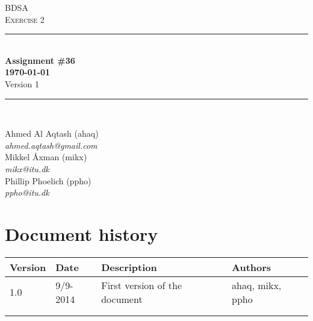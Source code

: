 \documentclass[10pt]{report}
\numberwithin{equation}{section} %
\numberwithin{figure}{section} %
\numberwithin{table}{section} %
\newcommand{\HRule}{\rule{\linewidth}{0.5mm}}
\begin{document}
\begin{titlepage}

\begin{center}

\textsc{\LARGE BDSA}\\[1.5cm]

\textsc{\Large Exercise 2}\\[0.5cm]

\HRule \\[0.4cm]

{ \bfseries Assignment \#36 \\[0.5cm] 
    {\small \today}} \\[0.7cm]
    {\small Version 1}

\HRule \\ [6.5cm]

\begin{minipage}{0.5\textwidth}
\begin{flushleft} \large
Ahmed Al Aqtash (ahaq)\\
\textit{ahmed.aqtash@gmail.com}\\
Mikkel Åxman (mikx)\\
\textit{mikx@itu.dk}\\
Phillip Phoelich (ppho)\\
\textit{ppho@itu.dk}\\
[0.2cm]

\vfill 
\end{flushleft}
\end{minipage}



\end{center}

\end{titlepage}
\clearpage
\section{Document history}
\begin{table}[h]
\begin{tabularx}{\textwidth}{l l X l}
\textbf{Version} & \textbf{Date} & \textbf{Description} & \textbf{Authors} \\ \midrule
1.0     & 9/9-2014 & First version of the document & ahaq, mikx, ppho  \\
        &          &                               & \\
        &          &                               & \\
\end{tabularx}
\end{table}
\end{document}
